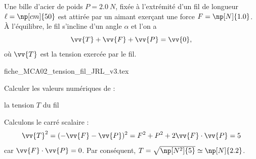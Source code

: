                                 \initialisationPartieGauche %
Une bille d'acier de poids $P=\SI{2.0}{N}$, fixée à l'extrémité d'un fil de longueur $\ell=\np[cm]{50}$ est attirée par un aimant exerçant une force $F=\np[N]{1.0}$. À l'équilibre, le fil s'incline d'un angle $\alpha$ et l'on a 
\[
	\vv{T}+\vv{F}+\vv{P}=\vv{0},
\]
où $\vv{T}$ est la tension exercée par le fil. 
                                \initialisationPartieDroite %
\begin{center}
{fiche_MCA02_tension_fil_JRL_v3.tex}
\end{center}
                               \finalisationDuPartageDePage %

Calculer les valeurs numériques de :



\debutEntrainement

\begin{enonce}
la tension $T$ du fil	 
\end{enonce}


\begin{corrige}
	Calculons le carré scalaire : 
	\[
	\vv{T}^2=(-\vv{F}-\vv{P})^2=
	F^2+P^2+2 \vv{F}\cdot \vv{P}=5
	\]
	car $\vv{F}\cdot \vv{P} = 0$.
	Par conséquent, $T=\sqrt{ \np[N^2]{5}}\simeq \np[N]{2.2}$. 
\end{corrige}

